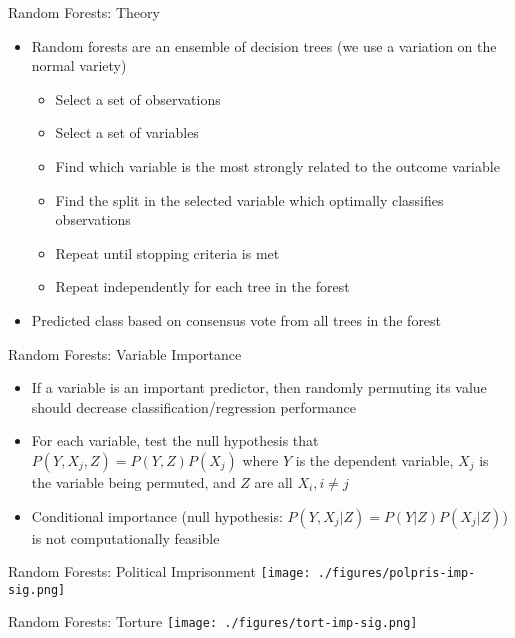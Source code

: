 \documentclass{beamer}
\begin{document}
\begin{frame}{Random Forests: Theory}
  \begin{itemize}
  \item Random forests are an ensemble of decision trees (we use a variation on the normal variety)
    \begin{itemize}
    \item Select a set of observations
    \item Select a set of variables
    \item Find which variable is the most strongly related to the outcome variable
    \item Find the split in the selected variable which optimally classifies observations
    \item Repeat until stopping criteria is met
    \item Repeat independently for each tree in the forest
    \end{itemize}
  \item Predicted class based on consensus vote from all trees in the forest
  \end{itemize}
\end{frame}

\begin{frame}{Random Forests: Variable Importance}
  \begin{itemize}
  \item If a variable is an important predictor, then randomly permuting its value should decrease classification/regression performance
  \item For each variable, test the null hypothesis that $P(Y, X_j, Z) = P(Y, Z)P(X_j)$ where $Y$ is the dependent variable, $X_j$ is the variable being permuted, and $Z$ are all $X_i, i \neq j$
  \item Conditional importance (null hypothesis: $P(Y, X_j|Z) = P(Y|Z)P(X_j|Z)$) is not computationally feasible
  \end{itemize}
\end{frame}

\begin{frame}{Random Forests: Political Imprisonment}
  \centering
  \texttt{[image: ./figures/polpris-imp-sig.png]}
\end{frame}

\begin{frame}{Random Forests: Torture}
  \centering
  \texttt{[image: ./figures/tort-imp-sig.png]}
\end{frame}
\end{document}
